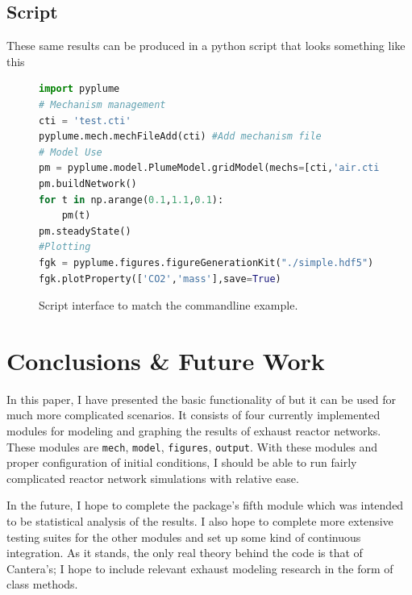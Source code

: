 \documentclass[smallextended,referee]{svjour3}
\newenvironment{codeblock}[1]
{
\begin{figure}[hbt]
\newcommand{\captionMacro}{#1}
\centering
\begin{tcolorbox}[width=15cm]
}
{
\end{tcolorbox}
\caption{\captionMacro{}}
\end{figure}
}
\begin{document}
\subsection{\textbf{Script}}
These same results can be produced in a python script that looks something like this
\begin{codeblock}{Script interface to match the commandline example.}
\begin{lstlisting}[language=Python]
import pyplume
# Mechanism management
cti = 'test.cti'
pyplume.mech.mechFileAdd(cti) #Add mechanism file
# Model Use
pm = pyplume.model.PlumeModel.gridModel(mechs=[cti,'air.cti',cti])
pm.buildNetwork()
for t in np.arange(0.1,1.1,0.1):
    pm(t)
pm.steadyState()
#Plotting
fgk = pyplume.figures.figureGenerationKit("./simple.hdf5")
fgk.plotProperty(['CO2','mass'],save=True)
\end{lstlisting}
\label{code:script}
\end{codeblock}



\section{Conclusions \& Future Work}

In this paper, I have presented the basic functionality of \pyplume{} but it can be used for much more complicated scenarios. It consists of four currently implemented modules for modeling and graphing the results of exhaust reactor networks. These modules are \texttt{mech}, \texttt{model}, \texttt{figures}, \texttt{output}. With these modules and proper configuration of initial conditions, I should be able to run fairly complicated reactor network simulations with relative ease.

In the future, I hope to complete the package's fifth module which was intended to be statistical analysis of the results. I also hope to complete more extensive testing suites for the other modules and set up some kind of continuous integration. As it stands, the only real theory behind the code is that of Cantera's\cite{cantera}; I hope to include relevant exhaust modeling research in the form of class methods.



\end{document}
